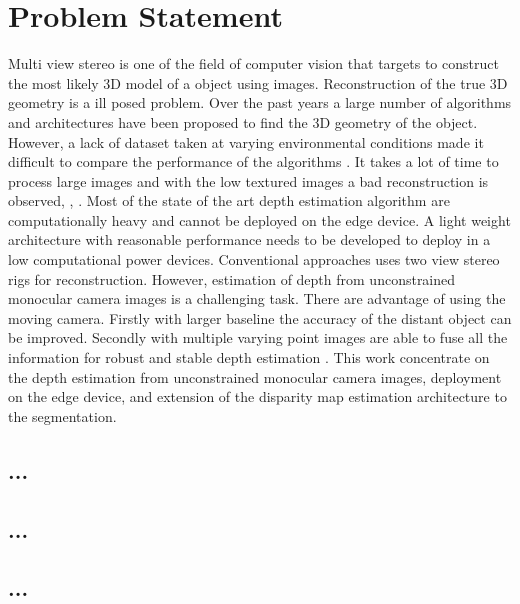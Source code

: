     \section{Problem Statement}
    Multi view stereo is one of the field of computer vision that targets to construct the most likely 3D model of a object using images. Reconstruction of the true 3D geometry is a ill posed problem. Over the past years a large number of algorithms and architectures have been proposed to find the 3D geometry of the object. However, a lack of dataset taken at varying environmental conditions made it difficult to compare the performance of the algorithms \cite{02_seitz2006comparison}. It takes a lot of time to process large images and with the low textured images a bad reconstruction is observed\cite{37_jancosek2009segmentation}, \cite{02_seitz2006comparison}, \cite{38_strecha2008benchmarking}. Most of the state of the art depth estimation algorithm are computationally heavy and cannot be deployed on the edge device. A light weight architecture with reasonable performance needs to be developed to deploy in a low computational power devices. Conventional approaches uses two view stereo rigs for reconstruction. However, estimation of depth from unconstrained monocular camera images is a challenging task. There are advantage of using the moving camera. Firstly with larger baseline the accuracy of the distant object can be improved. Secondly with multiple varying point images are able to fuse all the information for robust and stable depth estimation \cite{12_hou2019multi}. This work concentrate on the depth estimation from unconstrained monocular camera images, deployment on the edge device, and extension of the disparity map estimation architecture to the segmentation.
    
    \subsection{...}

    \lipsum[21-30]

    \subsection{...}


    \subsection{...}

